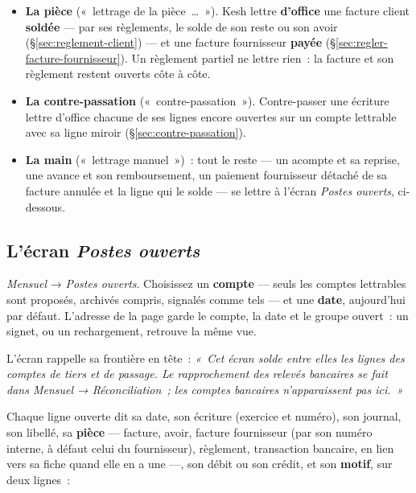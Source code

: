 \documentclass[a4paper,11pt,oneside]{article}
\begin{document}
\begin{itemize}
    \item \textbf{La pièce} («~lettrage de la pièce~\ldots~»). Kesh lettre \textbf{d'office} une
          facture client \textbf{soldée} --- par ses règlements, le solde de son reste ou son
          avoir (\S\ref{sec:reglement-client}) --- et une facture fournisseur
          \textbf{payée} (\S\ref{sec:regler-facture-fournisseur}). Un règlement partiel ne
          lettre rien~: la facture et son règlement restent ouverts côte à côte.
    \item \textbf{La contre-passation} («~contre-passation~»). Contre-passer une écriture lettre
          d'office chacune de ses lignes encore ouvertes sur un compte lettrable avec sa ligne
          miroir (\S\ref{sec:contre-passation}).
    \item \textbf{La main} («~lettrage manuel~»)~: tout le reste --- un acompte et sa reprise,
          une avance et son remboursement, un paiement fournisseur détaché de sa facture
          annulée et la ligne qui le solde --- se lettre à l'écran \emph{Postes ouverts},
          ci-dessous.
\end{itemize}

\subsection{L'écran \emph{Postes ouverts}}

\emph{Mensuel} → \emph{Postes ouverts}. Choisissez un \textbf{compte} --- seuls les comptes
lettrables sont proposés, archivés compris, signalés comme tels --- et une \textbf{date},
aujourd'hui par défaut. L'adresse de la page garde le compte, la date et le groupe ouvert~: un
signet, ou un rechargement, retrouve la même vue.

L'écran rappelle sa frontière en tête~: \emph{«~Cet écran solde entre elles les lignes des
comptes de tiers et de passage. Le rapprochement des relevés bancaires se fait dans Mensuel →
Réconciliation~; les comptes bancaires n'apparaissent pas ici.~»}

Chaque ligne ouverte dit sa date, son écriture (exercice et numéro), son journal, son libellé,
sa \textbf{pièce} --- facture, avoir, facture fournisseur (par son numéro interne, à défaut celui du fournisseur), règlement, transaction bancaire, en
lien vers sa fiche quand elle en a une ---, son débit ou son crédit, et son \textbf{motif}, sur
deux lignes~:
\end{document}
